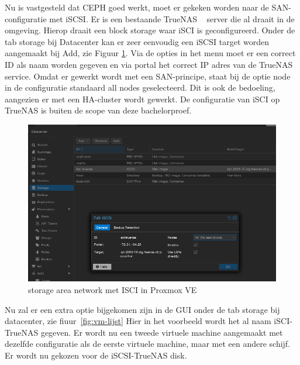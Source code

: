 Nu is vastgesteld dat CEPH goed werkt, moet er gekeken worden naar de SAN-configuratie met iSCSI.
Er is een bestaande TrueNAS ~\autocite{truenas} server die al draait in de omgeving. Hierop draait een block storage waar iSCI is geconfigureerd.
Onder de tab storage bij Datacenter kan er zeer eenvoudig een iSCSI target worden aangemaakt bij Add, zie Figuur \ref{fig:iscsi-SAN}.
Via de opties in het menu moet er een correct ID als naam worden gegeven en via portal het correct IP adres van de TrueNAS service.
Omdat er gewerkt wordt met een SAN-principe, staat bij de optie node in de configuratie standaard all nodes geselecteerd. Dit is ook de bedoeling, aangezien er met een HA-cluster wordt gewerkt.
De configuratie van iSCI op TrueNAS is buiten de scope van deze bachelorproef.
\begin{figure}[H]
  \centering
  \includegraphics[width=1.0\textwidth]{../poc/iscsi-prox.png}
  \caption{storage area network met ISCI in Proxmox VE}
  \label{fig:iscsi-SAN}
\end{figure}
Nu zal er een extra  optie bijgekomen zijn in de GUI onder de tab storage bij datacenter, zie fiuur~\ref{fig:vm-lijst}  Hier in het voorbeeld wordt het al naam iSCI-TrueNAS gegeven.
Er wordt nu een tweede virtuele machine aangemaakt met dezelfde configuratie als de eerste virtuele machine, maar met een andere schijf. Er wordt nu gekozen voor de iSCSI-TrueNAS disk.
